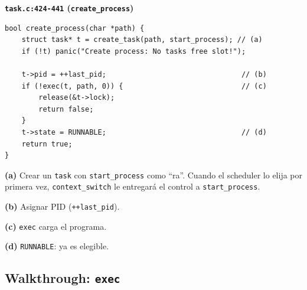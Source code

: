 \documentclass[11pt,a4paper]{article}
\begin{document}
\begin{walkthrough}
\textbf{\texttt{task.c:424-441} (\texttt{create\_process})}

\begin{lstlisting}[style=cstyle]
bool create_process(char *path) {
    struct task* t = create_task(path, start_process); // (a)
    if (!t) panic("Create process: No tasks free slot!");

    t->pid = ++last_pid;                                // (b)
    if (!exec(t, path, 0)) {                            // (c)
        release(&t->lock);
        return false;
    }
    t->state = RUNNABLE;                                // (d)
    return true;
}
\end{lstlisting}

\textbf{(a)} Crear un \texttt{task} con \texttt{start\_process} como
``ra''. Cuando el scheduler lo elija por primera vez,
\texttt{context\_switch} le entregará el control a
\texttt{start\_process}.

\textbf{(b)} Asignar PID (\texttt{++last\_pid}).

\textbf{(c)} \texttt{exec} carga el programa.

\textbf{(d)} \texttt{RUNNABLE}: ya es elegible.
\end{walkthrough}

\subsection*{Walkthrough: \texttt{exec}}
\end{document}
